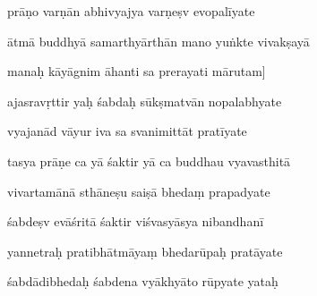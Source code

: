 \documentclass[article,12pt,a4paper]{memoir}%
\newcounter{parCount}
\begin{document}
	  
	  \pstart \leavevmode%
	prāṇo varṇān abhivyajya varṇeṣv evopalīyate 
	{}
	\pend%
      

	  
	  \pstart {} ātmā buddhyā samarthyārthān mano yuṅkte vivakṣayā 
	{}
	\pend%
      

	  
	  \pstart \leavevmode%
	manaḥ kāyāgnim āhanti sa prerayati mārutam] 
	{}
	\pend%
      

	  
	  \pstart {} ajasravṛttir yaḥ śabdaḥ sūkṣmatvān nopalabhyate 
	{}
	\pend%
      

	  
	  \pstart \leavevmode%
	vyajanād vāyur iva sa svanimittāt pratīyate 
	{}
	\pend%
      

	  
	  \pstart {} tasya prāṇe ca yā śaktir yā ca buddhau vyavasthitā 
	{}
	\pend%
      

	  
	  \pstart \leavevmode%
	vivartamānā sthāneṣu saiṣā bhedaṃ prapadyate 
	{}
	\pend%
      

	  
	  \pstart {} śabdeṣv evāśritā śaktir viśvasyāsya nibandhanī 
	{}
	\pend%
      

	  
	  \pstart \leavevmode%
	yannetraḥ pratibhātmāyaṃ bhedarūpaḥ pratāyate 
	{}
	\pend%
      

	  
	  \pstart {} śabdādibhedaḥ śabdena vyākhyāto rūpyate yataḥ 
	{}
	\pend%
      
\end{document}
